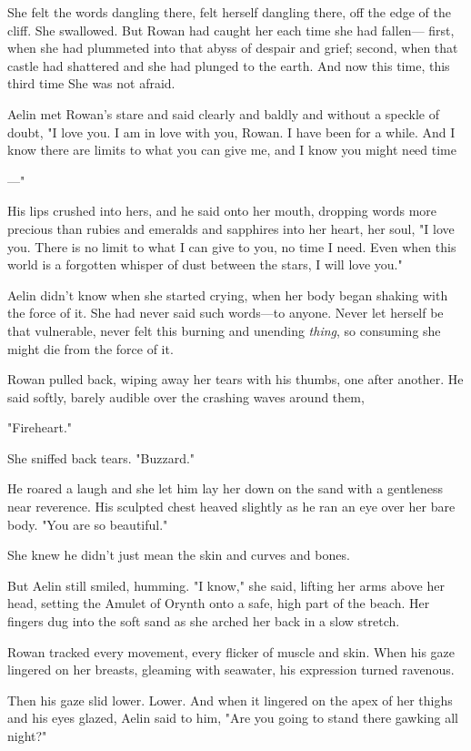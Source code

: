 She felt the words dangling there, felt herself dangling there, off the edge of the cliff. She swallowed. But Rowan had caught her each time she had fallen--- first, when she had plummeted into that abyss of despair and grief; second, when that castle had shattered and she had plunged to the earth. And now this time, this third time  She was not afraid.

Aelin met Rowan's stare and said clearly and baldly and without a speckle of doubt, "I love you. I am in love with you, Rowan. I have been for a while. And I know there are limits to what you can give me, and I know you might need time

---"

His lips crushed into hers, and he said onto her mouth, dropping words more precious than rubies and emeralds and sapphires into her heart, her soul, "I love you. There is no limit to what I can give to you, no time I need. Even when this world is a forgotten whisper of dust between the stars, I will love you."

Aelin didn't know when she started crying, when her body began shaking with the force of it. She had never said such words---to anyone. Never let herself be that vulnerable, never felt this burning and unending
\emph{thing}, so consuming she might die from the force of it.

Rowan pulled back, wiping away her tears with his thumbs, one after another. He said softly, barely audible over the crashing waves around them,

"Fireheart."

She sniffed back tears. "Buzzard."

He roared a laugh and she let him lay her down on the sand with a gentleness near reverence. His sculpted chest heaved slightly as he ran an eye over her bare body. "You  are so beautiful."

She knew he didn't just mean the skin and curves and bones.

But Aelin still smiled, humming. "I know," she said, lifting her arms above her head, setting the Amulet of Orynth onto a safe, high part of the beach. Her fingers dug into the soft sand as she arched her back in a slow stretch.

Rowan tracked every movement, every flicker of muscle and skin. When his gaze lingered on her breasts, gleaming with seawater, his expression turned ravenous.

Then his gaze slid lower. Lower. And when it lingered on the apex of her thighs and his eyes glazed, Aelin said to him, "Are you going to stand there gawking all night?"

